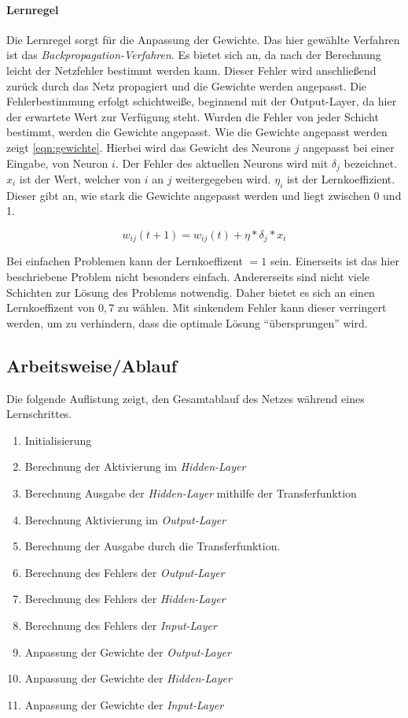 \paragraph{Lernregel}
Die Lernregel sorgt für die Anpassung der Gewichte. Das hier gewählte
Verfahren ist das \textit{Backpropagation-Verfahren}.
Es bietet sich an, da nach der Berechnung leicht der Netzfehler bestimmt werden kann.
Dieser Fehler wird anschließend zurück durch das Netz propagiert und die Gewichte
werden angepasst. Die Fehlerbestimmung erfolgt schichtweiße, beginnend mit der Output-Layer,
da hier der erwartete Wert zur Verfügung steht. Wurden die Fehler von jeder
Schicht bestimmt, werden die Gewichte angepasst.
Wie die Gewichte angepasst werden zeigt \autoref{eqn:gewichte}.
Hierbei wird das Gewicht des Neurons $j$ angepasst bei einer Eingabe,
von Neuron $i$. Der Fehler des aktuellen Neurons wird mit $\delta_j$ bezeichnet.
$x_i$ ist der Wert, welcher von $i$ an $j$ weitergegeben wird.
$\eta_i$ ist der Lernkoeffizient.
Dieser gibt an, wie stark die Gewichte angepasst werden und liegt zwischen 0 und 1.

\begin{equation}
    w_{ij}(t+1) = w_{ij}(t) + \eta * \delta_j*x_i
    \label{eqn:gewichte}
\end{equation}

Bei einfachen Problemen kann der Lernkoeffizent $=1$ sein.
Einerseits ist das hier beschriebene Problem nicht besonders einfach.
Andererseits sind nicht viele Schichten zur Lösung des Problems notwendig.
Daher bietet es sich an einen Lernkoeffizent von $0,7$ zu wählen.
Mit sinkendem Fehler kann dieser verringert werden,
um zu verhindern, dass die optimale Lösung \enquote{übersprungen} wird.

\subsection{Arbeitsweise/Ablauf}
Die folgende Auflistung zeigt, den Gesamtablauf des Netzes während eines
Lernschrittes.
\begin{enumerate}
    \item Initialisierung
    \item Berechnung der Aktivierung im \textit{Hidden-Layer}
    \item Berechnung Ausgabe der \textit{Hidden-Layer} mithilfe der Transferfunktion
    \item Berechnung Aktivierung im \textit{Output-Layer}
    \item Berechnung der Ausgabe durch die Transferfunktion.
    \item Berechnung des Fehlers der \textit{Output-Layer}
    \item Berechnung des Fehlers der \textit{Hidden-Layer}
    \item Berechnung des Fehlers der \textit{Input-Layer}
    \item Anpassung der Gewichte der \textit{Output-Layer}
    \item Anpassung der Gewichte der \textit{Hidden-Layer}
    \item Anpassung der Gewichte der \textit{Input-Layer}
\end{enumerate}